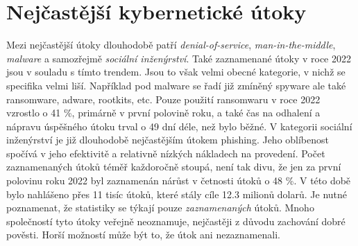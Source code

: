 \section{Nejčastější kybernetické útoky}\label{sec:nejcastejsi-kyberneticke-utoky}
Mezi nejčastější útoky dlouhodobě patří \textit{denial-of-service}, \textit{man-in-the-middle}, \textit{malware} a samozřejmě \textit{sociální inženýrství}\cite{LI20218176}.
Také zaznamenané útoky v roce 2022 jsou v souladu s tímto trendem.
Jsou to však velmi obecné kategorie, v nichž se specifika velmi liší.
Například pod malware se řadí již zmíněný spyware ale také ransomware, adware, rootkits, etc.
Pouze použití ransomwaru v roce 2022 vzrostlo o 41 \%, primárně v první polovině roku, a také čas na odhalení a nápravu úspěšného útoku trval o 49 dní déle, než bylo běžné.
V kategorii sociální inženýrství je již dlouhodobě nejčastějším útokem phishing.
Jeho oblíbenost spočívá v jeho efektivitě a relativně nízkých nákladech na provedení.
Počet zaznamenaných útoků téměř každoročně stoupá\cite{moje_bakalarka}, není tak divu, že jen za první polovinu roku 2022 byl zaznamenán nárůst v četnosti útoků o 48 \%.
V této době bylo nahlášeno přes 11 tisíc útoků, které stály cíle 12.3 milionů dolarů.
Je nutné poznamenat, že statistiky se týkají pouze \textit{zaznamenaných} útoků.
Mnoho společností tyto útoky veřejně neoznamuje, nejčastěji z důvodu zachování dobré pověsti.
Horší možností může být to, že útok ani nezaznamenali.\cite{securityintelligence_most_common_2022_attacks}

